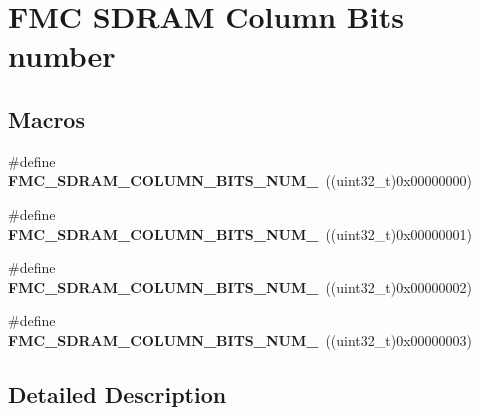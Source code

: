 \hypertarget{group___f_m_c___s_d_r_a_m___column___bits__number}{}\section{F\+MC S\+D\+R\+AM Column Bits number}
\label{group___f_m_c___s_d_r_a_m___column___bits__number}
\subsection*{Macros}
\begin{DoxyCompactItemize}
\item 
\#define {\bfseries F\+M\+C\+\_\+\+S\+D\+R\+A\+M\+\_\+\+C\+O\+L\+U\+M\+N\+\_\+\+B\+I\+T\+S\+\_\+\+N\+U\+M\+\_}~((uint32\+\_\+t)0x00000000)\hypertarget{group___f_m_c___s_d_r_a_m___column___bits__number_gacff6ecebd16a4dcc371c8cf3d46ca35c}{}\label{group___f_m_c___s_d_r_a_m___column___bits__number_gacff6ecebd16a4dcc371c8cf3d46ca35c}

\item 
\#define {\bfseries F\+M\+C\+\_\+\+S\+D\+R\+A\+M\+\_\+\+C\+O\+L\+U\+M\+N\+\_\+\+B\+I\+T\+S\+\_\+\+N\+U\+M\+\_}~((uint32\+\_\+t)0x00000001)\hypertarget{group___f_m_c___s_d_r_a_m___column___bits__number_gaa7b5ef2abd57e77c54328f3e378bcf61}{}\label{group___f_m_c___s_d_r_a_m___column___bits__number_gaa7b5ef2abd57e77c54328f3e378bcf61}

\item 
\#define {\bfseries F\+M\+C\+\_\+\+S\+D\+R\+A\+M\+\_\+\+C\+O\+L\+U\+M\+N\+\_\+\+B\+I\+T\+S\+\_\+\+N\+U\+M\+\_}~((uint32\+\_\+t)0x00000002)\hypertarget{group___f_m_c___s_d_r_a_m___column___bits__number_ga6e8ebd8ef747f00d4004056da4f4fac2}{}\label{group___f_m_c___s_d_r_a_m___column___bits__number_ga6e8ebd8ef747f00d4004056da4f4fac2}

\item 
\#define {\bfseries F\+M\+C\+\_\+\+S\+D\+R\+A\+M\+\_\+\+C\+O\+L\+U\+M\+N\+\_\+\+B\+I\+T\+S\+\_\+\+N\+U\+M\+\_}~((uint32\+\_\+t)0x00000003)\hypertarget{group___f_m_c___s_d_r_a_m___column___bits__number_ga1aff72b3751e633d64343bd265527294}{}\label{group___f_m_c___s_d_r_a_m___column___bits__number_ga1aff72b3751e633d64343bd265527294}

\end{DoxyCompactItemize}


\subsection{Detailed Description}
